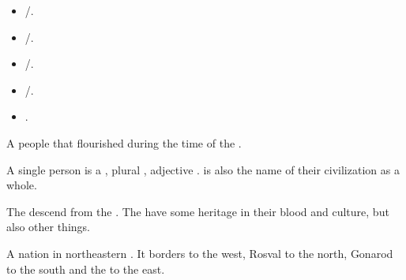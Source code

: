 \begin{gloss}
\begin{subgloss}
  \index{\Patriarch}
  \index{\Patron}
  \index{\Pater}
  \index{\Frater}
  \index{\Matriarch}
  \index{\Matron}
  \index{\Mater}
  \index{\Soror}
  \index{\Neophyte}
  \begin{itemize}
    \item \Patriarch/\Matriarch. 
    \item \Patron/\Matron.
    \item \Pater/\Mater.
    \item \Frater/\Soror. 
    \item \Neophyte. 
  \end{itemize}
\end{subgloss}







\begin{comment}
\paragraph{\Masthenon}
\end{comment}
\gitem{\Masthenon}
\index{\Masthenon}
A  \scathaese{} people that flourished during the time of the . 

A single person is a \quo{\Masthen}, plural \quo{\Masthenon}, adjective \quo{\Mastheno}. 
 is also the name of their civilization as a whole. 

The  descend from the \Masthenon. 
The  have some \Masthenon{} heritage in their blood and culture, but also other things. 
















\begin{comment}
\paragraph{\Marcil}
\end{comment}
\gitem{\Marcil}
\index{\Marcil}
A nation in northeastern \Velcad{}. 
It borders  to the west, {Rosval} to the north, {Gonarod} to the south and the {\Serpsea} to the east. 






\end{gloss}
